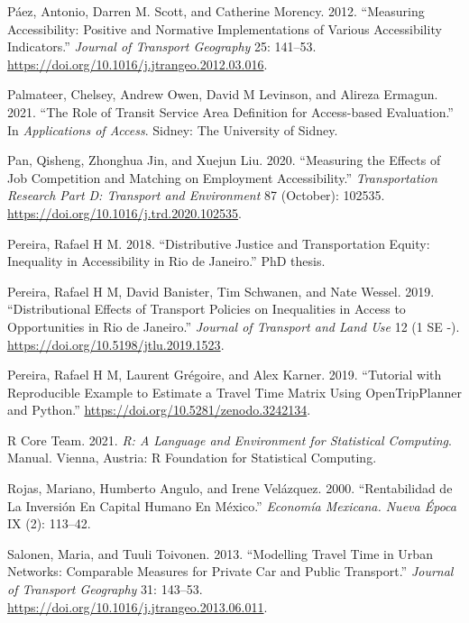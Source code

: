 \documentclass{article}
\newlength{\cslhangindent}
\newenvironment{CSLReferences}[2] %
 {\begin{list}{}{%
  \setlength{\itemindent}{0pt}
  \setlength{\leftmargin}{0pt}
  \setlength{\parsep}{0pt}
  \ifodd #1
   \setlength{\leftmargin}{\cslhangindent}
   \setlength{\itemindent}{-1\cslhangindent}
  \fi
  \setlength{\itemsep}{#2\baselineskip}}}
 {\end{list}}
\begin{document}
\begin{CSLReferences}{1}{0}
Páez, Antonio, Darren M. Scott, and Catherine Morency. 2012.
{``Measuring Accessibility: {Positive} and Normative Implementations of
Various Accessibility Indicators.''} \emph{Journal of Transport
Geography} 25: 141--53.
\url{https://doi.org/10.1016/j.jtrangeo.2012.03.016}.

Palmateer, Chelsey, Andrew Owen, David M Levinson, and Alireza Ermagun.
2021. {``The {Role} of {Transit Service Area Definition} for
{Access-based Evaluation}.''} In \emph{Applications of {Access}}.
Sidney: The University of Sidney.

Pan, Qisheng, Zhonghua Jin, and Xuejun Liu. 2020. {``Measuring the
Effects of Job Competition and Matching on Employment Accessibility.''}
\emph{Transportation Research Part D: Transport and Environment} 87
(October): 102535. \url{https://doi.org/10.1016/j.trd.2020.102535}.

Pereira, Rafael H M. 2018. {``Distributive {Justice} and {Transportation
Equity}: {Inequality} in Accessibility in {Rio} de {Janeiro}.''} PhD
thesis.

Pereira, Rafael H M, David Banister, Tim Schwanen, and Nate Wessel.
2019. {``Distributional Effects of Transport Policies on Inequalities in
Access to Opportunities in {Rio} de {Janeiro}.''} \emph{Journal of
Transport and Land Use} 12 (1 SE -).
\url{https://doi.org/10.5198/jtlu.2019.1523}.

Pereira, Rafael H M, Laurent Grégoire, and Alex Karner. 2019.
{``Tutorial with Reproducible Example to Estimate a Travel Time Matrix
Using {OpenTripPlanner} and {Python}.''}
\url{https://doi.org/10.5281/zenodo.3242134}.

R Core Team. 2021. \emph{R: {A} Language and Environment for Statistical
Computing}. Manual. Vienna, Austria: R Foundation for Statistical
Computing.

Rojas, Mariano, Humberto Angulo, and Irene Velázquez. 2000.
{``Rentabilidad de La Inversi{ó}n En Capital Humano En {M{é}xico}.''}
\emph{Econom{í}a Mexicana. Nueva {É}poca} IX (2): 113--42.

Salonen, Maria, and Tuuli Toivonen. 2013. {``Modelling Travel Time in
Urban Networks: Comparable Measures for Private Car and Public
Transport.''} \emph{Journal of Transport Geography} 31: 143--53.
\url{https://doi.org/10.1016/j.jtrangeo.2013.06.011}.


\end{CSLReferences}
\end{document}
